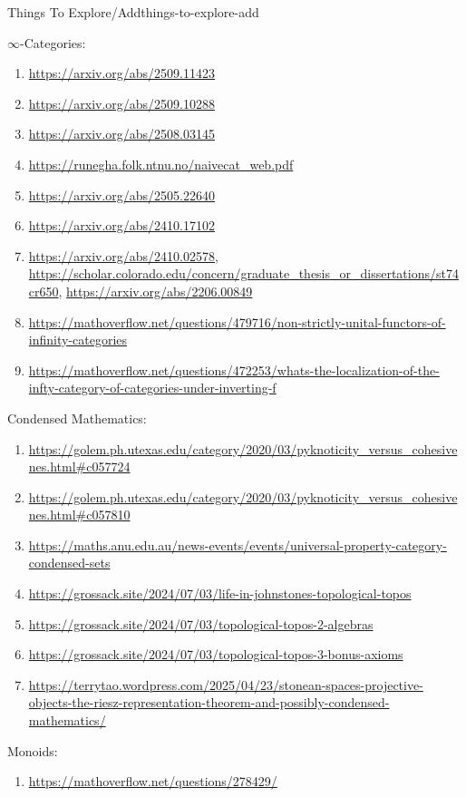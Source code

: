 \begin{remark}{Things To Explore/Add}{things-to-explore-add}
\begin{enumerate}
    \end{enumerate}
    $\infty$-Categories:
    \begin{enumerate}
        \item \url{https://arxiv.org/abs/2509.11423}
        \item \url{https://arxiv.org/abs/2509.10288}
        \item \url{https://arxiv.org/abs/2508.03145}
        \item \url{https://runegha.folk.ntnu.no/naivecat_web.pdf}
        \item \url{https://arxiv.org/abs/2505.22640}
        \item \url{https://arxiv.org/abs/2410.17102}
        \item \url{https://arxiv.org/abs/2410.02578}, \url{https://scholar.colorado.edu/concern/graduate_thesis_or_dissertations/st74cr650}, \url{https://arxiv.org/abs/2206.00849}
        \item \url{https://mathoverflow.net/questions/479716/non-strictly-unital-functors-of-infinity-categories}
        \item \url{https://mathoverflow.net/questions/472253/whats-the-localization-of-the-infty-category-of-categories-under-inverting-f}
    \end{enumerate}
    Condensed Mathematics:
    \begin{enumerate}
        \item \url{https://golem.ph.utexas.edu/category/2020/03/pyknoticity_versus_cohesivenes.html#c057724}
        \item \url{https://golem.ph.utexas.edu/category/2020/03/pyknoticity_versus_cohesivenes.html#c057810}
        \item \url{https://maths.anu.edu.au/news-events/events/universal-property-category-condensed-sets}
        \item \url{https://grossack.site/2024/07/03/life-in-johnstones-topological-topos}
        \item \url{https://grossack.site/2024/07/03/topological-topos-2-algebras}
        \item \url{https://grossack.site/2024/07/03/topological-topos-3-bonus-axioms}
        \item \url{https://terrytao.wordpress.com/2025/04/23/stonean-spaces-projective-objects-the-riesz-representation-theorem-and-possibly-condensed-mathematics/}
    \end{enumerate}
    Monoids:
    \begin{enumerate}
        \item \url{https://mathoverflow.net/questions/278429/}

\end{enumerate}
\end{remark}
